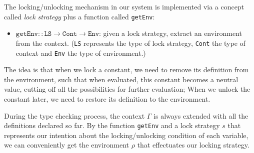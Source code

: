The locking/unlocking mechanism in our system is implemented via a concept called \emph{lock strategy} plus a function called \texttt{getEnv}: 
\begin{itemize}
  \item $\texttt{getEnv} :: \texttt{LS} \to \texttt{Cont} \to \texttt{Env}$: given a lock strategy, extract an environment from the context. (\texttt{LS} represents the type of lock strategy, \texttt{Cont} the type of context and \texttt{Env} the type of environment.) 
\end{itemize}

The idea is that when we lock a constant, we need to remove its definition from the environment, such that when evaluated, this constant becomes a neutral value, cutting off all the possibilities for further evaluation; When we unlock the constant later, we need to restore its definition to the environment.

During the type checking process, the context $\Gamma$ is always extended with all the definitions declared so far. By the function \texttt{getEnv} and a lock strategy $s$ that represents our intention about the locking/unlocking condition of each variable, we can conveniently get the environment $\rho$ that effectuates our locking strategy.

